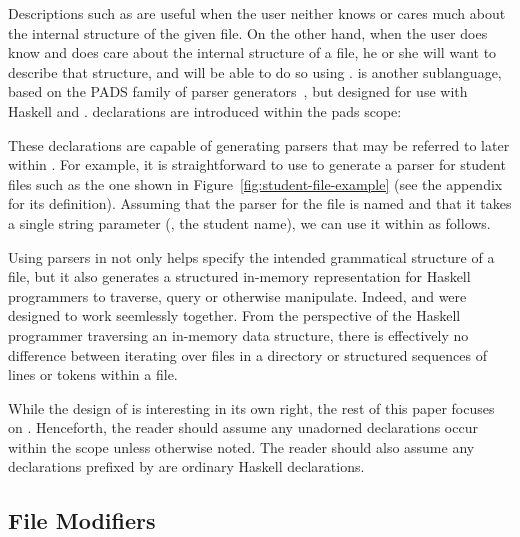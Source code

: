 \documentclass[nocopyrightspace,natbib]{sigplanconf}
\begin{document}
Descriptions such as  are useful when the user neither knows or cares much about
the internal structure of the given file.  On the other hand, when the user does know and does
care about the internal structure of a file, he or she will want to describe that structure,
and will be able to do so using \padshaskell{}.  \padshaskell{} is another sublanguage,
based on the PADS family of parser 
generators~\cite{fisher+:pads,fisher+:popl06,mandelbaum+:pads-ml}, but 
designed for use with Haskell and \forest{}.  \padshaskell{} declarations are introduced
within the pads scope:
\noindent
\begin{code}
\end{code}
These declarations are capable of generating parsers that may be referred
to later within \forest{}.  For example, it is straightforward to use \padshaskell{} to generate
a parser for student files such as the one shown in Figure~\ref{fig:student-file-example}
(see the appendix for its definition).
Assuming that the parser for the file is named  and that it takes a single string parameter
(, the student name), we can use it within \forest{} as follows.
\begin{code}
[forest| 
  type SFile (n::String) = File (Student n) 
|]
\end{code}
Using \padshaskell{} parsers in \forest{} not only helps specify the intended grammatical structure
of a file, but it also generates a structured in-memory representation for Haskell programmers
to traverse, query or otherwise manipulate.  Indeed, \padshaskell{} and \forest{}
were designed to work seemlessly together.  From the perspective of the Haskell
programmer traversing an in-memory data structure, there is effectively
no difference between iterating over files in a directory or
structured sequences of lines or tokens within a file.

While the design of \padshaskell{} is interesting in its own right, the rest of this
paper focuses on \forest{}.  Henceforth, the reader should assume
any unadorned declarations 
occur within the \forest{} scope \cd{[forest| ... |]} unless otherwise noted.
The reader should also assume any declarations prefixed by \cd{>} are ordinary
Haskell declarations.

\subsection{File Modifiers}
\label{sec:file-modifiers}
\end{document}
